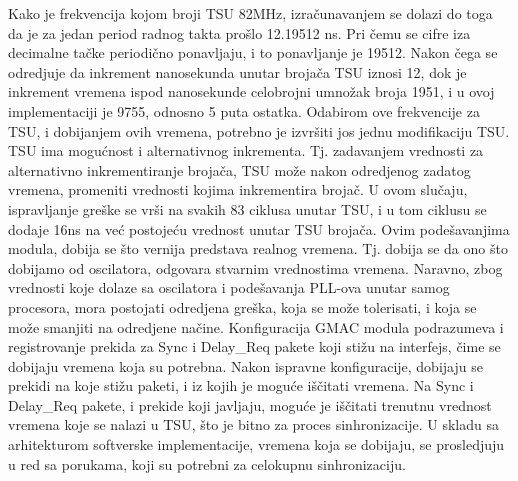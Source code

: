 \documentclass[a4paper,12pt, master]{etf}
\begin{document}
	Kako je frekvencija kojom broji TSU 82MHz, izra\v{c}unavanjem se dolazi do
	toga da je za jedan period radnog takta pro\v{s}lo 12.19512 ns. Pri \v{c}emu
    se cifre iza decimalne ta\v{c}ke periodi\v{c}no ponavljaju,  i to
    ponavljanje je 19512. Nakon \v{c}ega se odredjuje da inkrement nanosekunda
    unutar broja\v{c}a TSU iznosi 12, dok je inkrement vremena ispod nanosekunde
    celobrojni umno\v{z}ak broja 1951, i u ovoj implementaciji je 9755, odnosno
    5 puta ostatka. Odabirom ove frekvencije za TSU, i dobijanjem ovih vremena,
    potrebno je izvr\v{s}iti jos jednu modifikaciju TSU\@. TSU ima mogu\'{c}nost
    i alternativnog inkrementa. Tj\@. zadavanjem vrednosti za alternativno
    inkrementiranje broja\v{c}a, TSU mo\v{z}e nakon odredjenog zadatog vremena,
    promeniti vrednosti kojima inkrementira broja\v{c}. U ovom slu\v{c}aju,
    ispravljanje gre\v{s}ke se vr\v{s}i na svakih 83 ciklusa unutar TSU, i u tom
    ciklusu se dodaje 16ns na ve\'{c} postoje\'{c}u vrednost unutar TSU
    broja\v{c}a. Ovim pode\v{s}avanjima modula, dobija se \v{s}to vernija
    predstava realnog vremena. Tj\@. dobija se da ono \v{s}to dobijamo od
    oscilatora, odgovara stvarnim vrednostima vremena. Naravno, zbog vrednosti
    koje dolaze sa oscilatora i pode\v{s}avanja PLL-ova unutar samog procesora,
    mora postojati odredjena gre\v{s}ka, koja se mo\v{z}e tolerisati, i koja se
    mo\v{z}e smanjiti na odredjene na\v{c}ine. Konfiguracija GMAC modula
    podrazumeva i registrovanje prekida za Sync i Delay\_Req pakete koji
    sti\v{z}u na interfejs, \v{c}ime se dobijaju vremena koja su potrebna. Nakon
    ispravne konfiguracije, dobijaju se prekidi na koje sti\v{z}u paketi, i iz
    kojih je mogu\'{c}e i\v{s}\v{c}itati vremena. Na Sync i Delay\_Req pakete,
    i prekide koji javljaju, mogu\'{c}e je i\v{s}\v{c}itati trenutnu vrednost
    vremena koje se nalazi u TSU, \v{s}to je bitno za proces sinhronizacije. U
    skladu sa arhitekturom softverske implementacije, vremena koja se dobijaju,
    se prosledjuju u red sa porukama, koji su potrebni za celokupnu
    sinhronizaciju.
\end{document}
